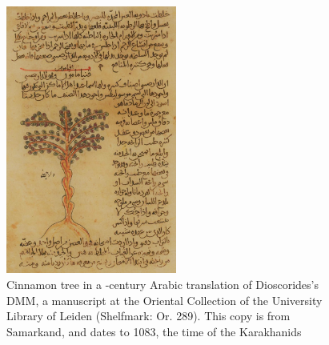 \begin{figure}
    \includegraphics[width=0.5\textwidth]{imgs/figs/cinnamon_manuscipt_cr.jpg}
  \caption[Cinnamon tree in a -century Arabic manuscript.]{Cinnamon tree in a -century Arabic translation of Dioscorides's \gls{DMM}, a manuscript at the Oriental Collection of the University Library of Leiden (Shelfmark: Or. 289). This copy is from Samarkand, and dates to 1083, the time of the Karakhanids \autocite[f. 9a]{dioscorides_kitab_1083}}
\label{fig:cinnamon_manuscript}
\end{figure}


